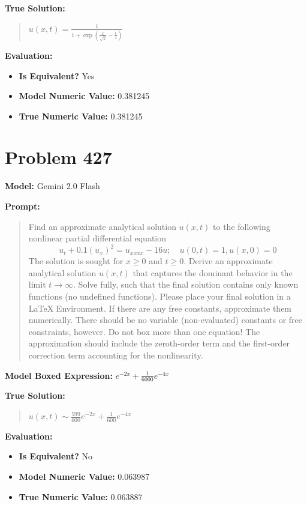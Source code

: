 \documentclass{article}
\begin{document}
\textbf{True Solution:}
\begin{quote}
$u(x,t) = \frac{1}{1+\exp{\left(\frac{x}{\sqrt{2}}-\frac{t}{4}\right)}}$
\end{quote}

\textbf{Evaluation:}
\begin{itemize}
\item \textbf{Is Equivalent?} Yes
\item \textbf{Model Numeric Value:} 0.381245
\item \textbf{True Numeric Value:} 0.381245
\end{itemize}
\vspace{1cm}
\section*{Problem 427}
\textbf{Model:} Gemini 2.0 Flash

\textbf{Prompt:}
\begin{quote}
Find an approximate analytical solution $u(x, t)$ to the following nonlinear partial differential equation $$u_t + 0.1 (u_x)^2 = u_{xxxx} - 16 u; \quad u(0, t) = 1, u(x, 0) = 0 $$ The solution is sought for $x \ge 0$ and $t \ge 0$. Derive an approximate analytical solution $u(x, t)$ that captures the dominant behavior in the limit $t \to \infty$. Solve fully, such that the final solution contains only known functions (no undefined functions). Please place your final solution in a \boxed{} LaTeX Environment. If there are any free constants, approximate them numerically. There should be no variable (non-evaluated) constants or free constraints, however. Do not box more than one equation! The approximation should include the zeroth-order term and the first-order correction term accounting for the nonlinearity.
\end{quote}
\textbf{Model Boxed Expression:} $e^{-2x} + \frac{1}{6000}e^{-4x}$

\textbf{True Solution:}
\begin{quote}
$u(x, t) \sim \frac{599}{600}e^{-2x} + \frac{1}{600}e^{-4x}$
\end{quote}

\textbf{Evaluation:}
\begin{itemize}
\item \textbf{Is Equivalent?} No
\item \textbf{Model Numeric Value:} 0.063987
\item \textbf{True Numeric Value:} 0.063887
\end{itemize}
\vspace{1cm}
\end{document}
